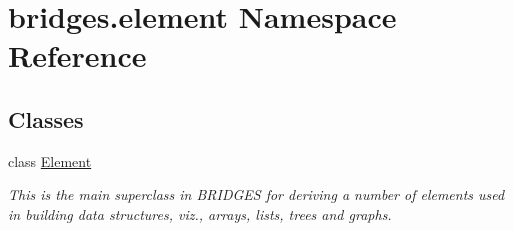 \hypertarget{namespacebridges_1_1element}{}\section{bridges.\+element Namespace Reference}
\label{namespacebridges_1_1element}
\subsection*{Classes}
\begin{DoxyCompactItemize}
\item 
class \mbox{\hyperlink{classbridges_1_1element_1_1_element}{Element}}
\begin{DoxyCompactList}\small\item\em This is the main superclass in B\+R\+I\+D\+G\+ES for deriving a number of elements used in building data structures, viz., arrays, lists, trees and graphs. \end{DoxyCompactList}\end{DoxyCompactItemize}
